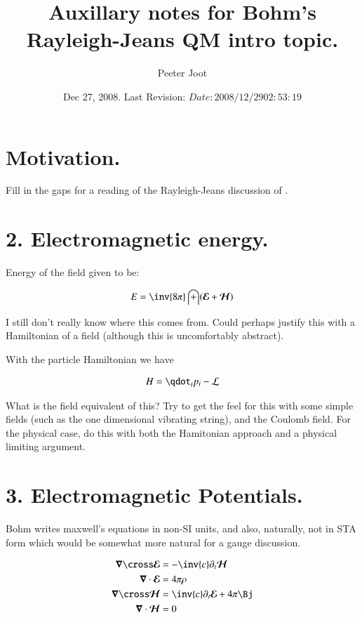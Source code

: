 \documentclass{article}
\title{ Auxillary notes for Bohm's Rayleigh-Jeans QM intro topic. }
\author{Peeter Joot}
\date{ Dec 27, 2008.  Last Revision: $Date: 2008/12/29 02:53:19 $ }
\newcommand{\EE}[0]{\boldsymbol{\mathcal{E}}}
\newcommand{\HH}[0]{\boldsymbol{\mathcal{H}}}
\begin{document}
\maketitle{}


\section{ Motivation. }

Fill in the gaps for a reading of the
Rayleigh-Jeans discussion of \cite{bohm1989qt}.

\section{ 2. Electromagnetic energy. }

Energy of the field given to be:

\begin{align*}
E = \inv{8\pi} \int (\EE + \HH)
\end{align*}

I still don't really know where this comes from.
Could perhaps justify this with a Hamiltonian of a field (although this is
uncomfortably abstract).

With the particle Hamiltonian we have

\begin{align*}
H = \qdot_i p_i -\LL
\end{align*}

What is the field equivalent of this?  Try to get the feel for this with some simple fields (such as the one dimensional vibrating string), and the Coulomb field.  For the physical case, do this with both the Hamitonian approach and a physical limiting argument.

\section{ 3. Electromagnetic Potentials. }

Bohm writes maxwell's equations in non-SI units, and also, naturally, not in STA form which would be somewhat more natural for a gauge
discussion.

\begin{align*}
\spacegrad \cross \EE &= -\inv{c} \partial_t \HH \\
\spacegrad \cdot \EE &= 4 \pi \rho \\
\spacegrad \cross \HH &= \inv{c} \partial_t \EE + 4 \pi \Bj \\
\spacegrad \cdot \HH &= 0
\end{align*}
\end{document}
